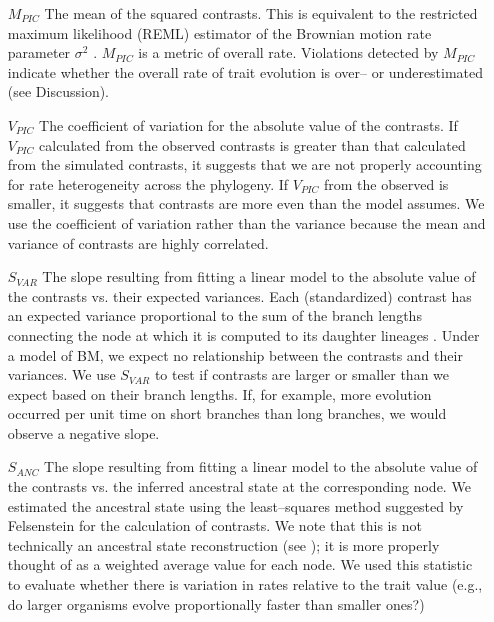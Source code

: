 \documentclass[a4paper,12pt]{article}
\begin{document}
\begin{enumerate}
\item[$M_{PIC}$] The mean of the squared contrasts. This is equivalent to the restricted maximum likelihood (REML) estimator of the Brownian motion rate parameter $\sigma^2$ \citep{Garland1992, Rohlf2001}. $M_{PIC}$ is a metric of overall rate. Violations detected by $M_{PIC}$ indicate whether the overall rate of trait evolution is over-- or underestimated (see Discussion).

\item[$V_{PIC}$] The coefficient of variation for the absolute value of the contrasts. If $V_{PIC}$ calculated from the observed contrasts is greater than that calculated from the simulated contrasts, it suggests that we are not properly accounting for rate heterogeneity across the phylogeny. If $V_{PIC}$ from the observed is smaller, it suggests that contrasts are more even than the model assumes. We use the coefficient of variation rather than the variance because the mean and variance of contrasts are highly correlated.

\item[$S_{VAR}$] The slope resulting from fitting a linear model to the absolute value of the contrasts vs. their expected variances. Each (standardized) contrast has an expected variance proportional to the sum of the branch lengths connecting the node at which it is computed to its daughter lineages  \citep{Felsenstein1985}. Under a model of BM, we expect no relationship between the contrasts and their variances. We use $S_{VAR}$ to test if contrasts are larger or smaller than we expect based on their branch lengths. If, for example, more evolution occurred per unit time on short branches than long branches, we would observe a negative slope.

\item[$S_{ANC}$] The slope resulting from fitting a linear model to the absolute value of the contrasts vs. the inferred ancestral state at the corresponding node. We estimated the ancestral state using the least--squares method suggested by Felsenstein \citep{Felsenstein1985} for the calculation of contrasts. We note that this is not technically an ancestral state reconstruction (see \citep{Felsenstein1985}); it is more properly thought of as a weighted average value for each node. We used this statistic to evaluate whether there is variation in rates relative to the trait value (e.g., do larger organisms evolve proportionally faster than smaller ones?)


\end{enumerate}
\end{document}
